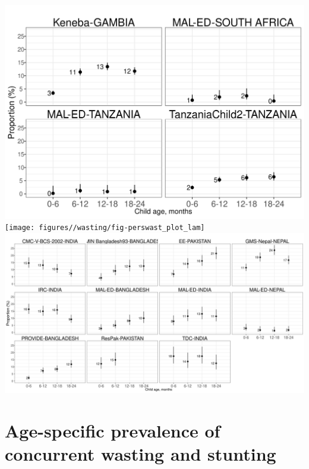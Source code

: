 \documentclass[
  9pt,
]{book}
\begin{document}
\includegraphics[width=29.17in]{figures//wasting/fig-perswast_plot_africa}
\texttt{[image: figures//wasting/fig-perswast\_plot\_lam]}
\includegraphics[width=62.5in]{figures//wasting/fig-perswast_plot_sasia}

\hypertarget{age-specific-prevalence-of-concurrent-wasting-and-stunting-1}{%
\section{Age-specific prevalence of concurrent wasting and stunting}\label{age-specific-prevalence-of-concurrent-wasting-and-stunting-1}}
\end{document}
